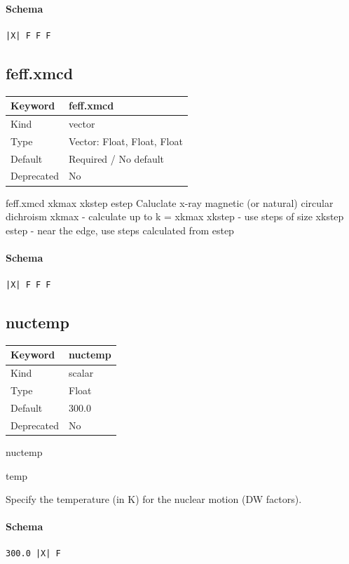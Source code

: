 \documentclass[11pt]{article}
\begin{document}
{{{{\paragraph{Schema}
\begin{Verbatim}
|X| F F F
\end{Verbatim}

\subsection{feff.xmcd}
\label{kw:feff-xmcd}
\begin{longtable}{|p{1.5in}|p{4.5in}|}
\hline
Keyword & feff.xmcd \\
\hline
Kind & vector \\
\hline
Type & Vector: Float, Float, Float \\
\hline
Default & Required / No default \\
\hline
Deprecated & No \\
\hline
\end{longtable}
 feff.xmcd{ xkmax xkstep estep }
 Caluclate x-ray magnetic (or natural) circular dichroism
   xkmax  - calculate up to k = xkmax
   xkstep - use steps of size xkstep
   estep  - near the edge, use steps calculated from estep

\paragraph{Schema}
\begin{Verbatim}
|X| F F F
\end{Verbatim}

\subsection{nuctemp}
\label{kw:nuctemp}
\begin{longtable}{|p{1.5in}|p{4.5in}|}
\hline
Keyword & nuctemp \\
\hline
Kind & scalar \\
\hline
Type & Float \\
\hline
Default & 300.0 \\
\hline
Deprecated & No \\
\hline
\end{longtable}

 nuctemp
 {
 temp

 Specify the temperature (in K) for the nuclear motion (DW factors).

\paragraph{Schema}
\begin{Verbatim}
300.0 |X| F
\end{Verbatim}

}}}}}
\end{document}
